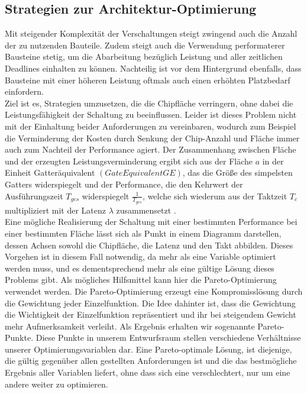\documentclass[conference]{IEEEtran}
\begin{document}
\subsection{Strategien zur Architektur-Optimierung}
Mit steigender Komplexität der Verschaltungen steigt zwingend auch die Anzahl der  zu nutzenden Bauteile. Zudem steigt auch die Verwendung performaterer Bausteine stetig, um die Abarbeitung bezüglich Leistung und aller zeitlichen Deadlines einhalten zu können. Nachteilig ist vor dem Hintergrund ebenfalls, dass Bausteine mit einer höheren Leistung oftmals auch einen erhöhten Platzbedarf einfordern\cite[S.327]{2}.\\
Ziel ist es, Strategien umzusetzen, die die Chipfläche verringern, ohne dabei die Leistungsfähigkeit der Schaltung zu beeinflussen. Leider ist dieses Problem nicht mit der Einhaltung beider Anforderungen zu vereinbaren, wodurch zum Beispiel die Verminderung der Kosten durch Senkung der Chip-Anzahl und Fläche immer auch zum Nachteil der Performance agiert. Der Zusammenhang zwischen Fläche und der erzeugten Leistungsverminderung ergibt sich aus der Fläche $a$ in der Einheit Gatteräquivalent $(Gate Equivalent GE)$, das die Größe des simpelsten Gatters widerspiegelt\cite[S.326]{2} und der Performance, die den Kehrwert der Ausführungszeit $T_{ges}$ widerspiegelt $\frac{1}{T_{ges}}$, welche sich wiederum aus der Taktzeit $T_c$ multipliziert mit der Latenz $\lambda$ zusammensetzt
\cite[S.325-326]{2}.\\
 Eine mögliche Realisierung der Schaltung mit einer bestimmten Performance bei einer bestimmten Fläche lässt sich als Punkt in einem Diagramm darstellen, dessen Achsen sowohl die Chipfläche, die Latenz und den Takt abbilden\cite[S.326]{2}.
 Dieses Vorgehen\cite{?} ist in diesem Fall notwendig, da mehr als eine Variable optimiert werden muss, und es dementsprechend mehr als eine gültige Lösung dieses Problems gibt. Als mögliches Hilfsmittel kann hier die Pareto-Optimierung verwendet werden. Die Pareto-Optimierung erzeugt eine Kompromisslösung durch die Gewichtung jeder Einzelfunktion. Die Idee dahinter ist, dass die Gewichtung die Wichtigkeit der Einzelfunktion repräsentiert und ihr bei steigendem Gewicht mehr Aufmerksamkeit verleiht\cite[S.45]{4}. Als Ergebnis erhalten wir sogenannte Pareto-Punkte. Diese Punkte in unserem Entwurfsraum stellen verschiedene Verhältnisse unserer Optimierungsvariablen dar. Eine Pareto-optimale Lösung, ist diejenige, die gültig gegenüber allen gestellten Anforderungen ist und die das bestmögliche Ergebnis aller Variablen liefert, ohne dass sich eine verschlechtert, nur um eine andere weiter zu optimieren.
\end{document}
